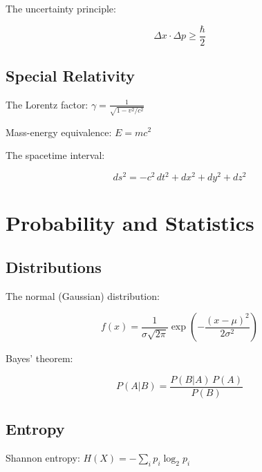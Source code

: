 \documentclass{article}
\begin{document}
The uncertainty principle:

$$\Delta x \cdot \Delta p \geq \frac{\hbar}{2}$$

\subsection{Special Relativity}

The Lorentz factor: $\gamma = \frac{1}{\sqrt{1 - v^2/c^2}}$

Mass-energy equivalence: $E = mc^2$

The spacetime interval:

$$ds^2 = -c^2\,dt^2 + dx^2 + dy^2 + dz^2$$

\section{Probability and Statistics}

\subsection{Distributions}

The normal (Gaussian) distribution:

$$f(x) = \frac{1}{\sigma\sqrt{2\pi}} \exp\left(-\frac{(x - \mu)^2}{2\sigma^2}\right)$$

Bayes' theorem:

$$P(A|B) = \frac{P(B|A)\,P(A)}{P(B)}$$

\subsection{Entropy}

Shannon entropy: $H(X) = -\sum_{i} p_i \log_2 p_i$

\end{document}
